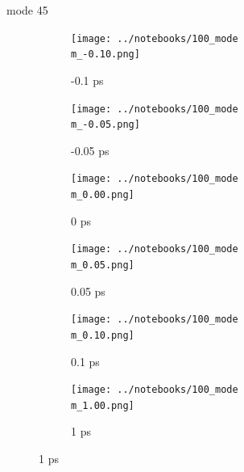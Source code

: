 \documentclass{beamer}
\begin{document}
\renewcommand\m{45}
\begin{frame}{mode \m}
	\begin{figure}
		\centering
		\begin{subfigure}[b]{\w\textwidth}
			\centering
			\texttt{[image: ../notebooks/100\_mode\\m\_-0.10.png]}
			\caption{-0.1 ps}
		\end{subfigure}
		\begin{subfigure}[b]{\w\textwidth}
			\centering
			\texttt{[image: ../notebooks/100\_mode\\m\_-0.05.png]}
			\caption{-0.05 ps}
		\end{subfigure}
		\begin{subfigure}[b]{\w\textwidth}
			\centering
			\texttt{[image: ../notebooks/100\_mode\\m\_0.00.png]}
			\caption{0 ps}
		\end{subfigure}
		\begin{subfigure}[b]{\w\textwidth}
			\centering
			\texttt{[image: ../notebooks/100\_mode\\m\_0.05.png]}
			\caption{0.05 ps}
		\end{subfigure}
		\begin{subfigure}[b]{\w\textwidth}
			\centering
			\texttt{[image: ../notebooks/100\_mode\\m\_0.10.png]}
			\caption{0.1 ps}
		\end{subfigure}
		\begin{subfigure}[b]{\w\textwidth}
			\centering
			\texttt{[image: ../notebooks/100\_mode\\m\_1.00.png]}
			\caption{1 ps}
		\end{subfigure}
	\end{figure}
\end{frame}
\end{document}
